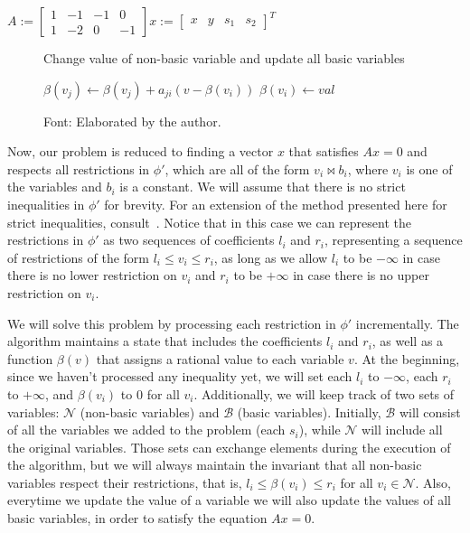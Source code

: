 \begin{center}
$
A :=
\begin{bmatrix}
  1 & -1 & -1 & 0 \\
  1 & -2 & 0 & -1
\end{bmatrix}
x :=
\begin{bmatrix}
  x & y & s_{1} & s_{2}
\end{bmatrix}^{T}
$
\end{center}

\begin{figure}[t]
\caption{Change value of non-basic variable and update all basic variables}
\begin{algorithmic}[1]
    \State $\beta(v_{j}) \gets \beta(v_{j}) + a_{ji}(v - \beta(v_{i}))$
  \EndFor
    \State $\beta(v_{i}) \gets val$
  \EndProcedure
\end{algorithmic}
\caption*{Font: Elaborated by the author.}
\end{figure}

Now, our problem is reduced to finding a vector $x$ that satisfies $Ax = 0$ and respects all restrictions in $\phi'$, which are all of the form $v_{i} \bowtie b_{i}$, where $v_{i}$ is one of the variables and $b_{i}$ is a constant. We will assume that there is no strict inequalities in $\phi'$ for brevity. For an extension of the method presented here for strict inequalities, consult~\cite{simplex_dpllt}. Notice that in this case we can represent the restrictions in $\phi'$ as two sequences of coefficients $l_{i}$ and $r_{i}$, representing a sequence of restrictions of the form $l_{i} \le v_{i} \le r_{i}$, as long as we allow $l_{i}$ to be $-\infty$ in case there is no lower restriction on $v_{i}$ and $r_{i}$ to be $+\infty$ in case there is no upper restriction on $v_{i}$.

We will solve this problem by processing each restriction in $\phi'$ incrementally. The algorithm maintains a state that includes the coefficients $l_{i}$ and $r_{i}$, as well as a function $\beta(v)$ that assigns a rational value to each variable $v$. At the beginning, since we haven't processed any inequality yet, we will set each $l_{i}$ to $-\infty$, each $r_{i}$ to $+\infty$, and $\beta(v_{i})$ to $0$ for all $v_{i}$. Additionally, we will keep track of two sets of variables: $\mathcal{N}$ (non-basic variables) and $\mathcal{B}$ (basic variables). Initially, $\mathcal{B}$ will consist of all the variables we added to the problem (each $s_{i}$), while $\mathcal{N}$ will include all the original variables.
Those sets can exchange elements during the execution of the algorithm, but we will always maintain the invariant that all non-basic variables respect their restrictions, that is, $l_{i} \le \beta(v_{i}) \le r_{i}$ for all $v_{i} \in \mathcal{N}$. Also, everytime we update the value of a variable we will also update the values of all basic variables, in order to satisfy the equation $Ax = 0$.

